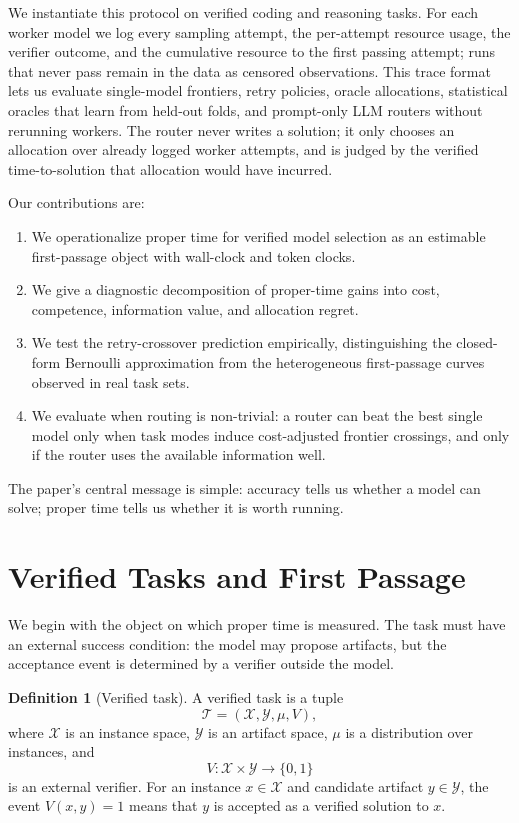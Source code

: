 \documentclass[10pt,twocolumn]{article}
\theoremstyle{definition}
\newtheorem{definition}{Definition}
\theoremstyle{plain}
\theoremstyle{remark}
\begin{document}
We instantiate this protocol on verified coding and reasoning tasks.  For each
worker model we log every sampling attempt, the per-attempt resource usage, the
verifier outcome, and the cumulative resource to the first passing attempt; runs
that never pass remain in the data as censored observations.  This trace format
lets us evaluate single-model frontiers, retry policies, oracle allocations,
statistical oracles that learn from held-out folds, and prompt-only LLM routers
without rerunning workers.  The router never writes a solution; it only chooses
an allocation over already logged worker attempts, and is judged by the verified
time-to-solution that allocation would have incurred.

Our contributions are:
\begin{enumerate}
  \item We operationalize proper time for verified model selection as an
  estimable first-passage object with wall-clock and token clocks.
  \item We give a diagnostic decomposition of proper-time gains into cost,
  competence, information value, and allocation regret.
  \item We test the retry-crossover prediction empirically, distinguishing the
  closed-form Bernoulli approximation from the heterogeneous first-passage
  curves observed in real task sets.
  \item We evaluate when routing is non-trivial: a router can beat the best
  single model only when task modes induce cost-adjusted frontier crossings, and
  only if the router uses the available information well.
\end{enumerate}

The paper's central message is simple: accuracy tells us whether a model can
solve; proper time tells us whether it is worth running.

\section{Verified Tasks and First Passage}
\label{sec:formalism}

We begin with the object on which proper time is measured.  The task must have
an external success condition: the model may propose artifacts, but the
acceptance event is determined by a verifier outside the model.

\begin{definition}[Verified task]
\label{def:verified-task}
A verified task is a tuple
\[
    \mathcal T = (\mathcal X,\mathcal Y,\mu,V),
\]
where \(\mathcal X\) is an instance space, \(\mathcal Y\) is an artifact space,
\(\mu\) is a distribution over instances, and
\[
    V:\mathcal X\times\mathcal Y\to\{0,1\}
\]
is an external verifier.  For an instance \(x\in\mathcal X\) and candidate
artifact \(y\in\mathcal Y\), the event \(V(x,y)=1\) means that \(y\) is accepted
as a verified solution to \(x\).
\end{definition}
\end{document}
